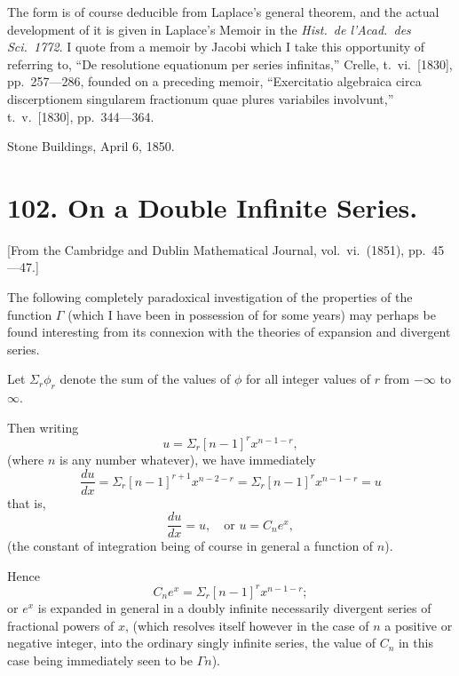 \documentclass[11pt,a4paper]{book}
\begin{document}
The form is of course deducible from Laplace's general theorem, and the actual development of it is given in Laplace's Memoir in the \textit{Hist.\ de l'Acad.\ des Sci.\ 1772}. I quote from a memoir by Jacobi which I take this opportunity of referring to, ``De resolutione equationum per series infinitas,'' Crelle, t.\ vi.\ [1830], pp.\ 257---286, founded on a preceding memoir, ``Exercitatio algebraica circa discerptionem singularem fractionum quae plures variabiles involvunt,'' t.\ v.\ [1830], pp.\ 344---364.

\begin{flushright}
Stone Buildings, April 6, 1850.
\end{flushright}
\clearpage


\section*{102. On a Double Infinite Series.}

[From the Cambridge and Dublin Mathematical Journal, vol.\ vi.\ (1851), pp.\ 45---47.]

The following completely paradoxical investigation of the properties of the function $\Gamma$ (which I have been in possession of for some years) may perhaps be found interesting from its connexion with the theories of expansion and divergent series.

Let $\Sigma_r \phi_r$ denote the sum of the values of $\phi$ for all integer values of $r$ from $-\infty$ to $\infty$.

Then writing
\begin{equation}
u = \Sigma_r [n-1]^r x^{n-1-r},\tag{1}\end{equation}
(where $n$ is any number whatever), we have immediately
\[\frac{du}{dx} = \Sigma_r [n-1]^{r+1} x^{n-2-r} = \Sigma_r [n-1]^r x^{n-1-r} = u\]
that is,
\[\frac{du}{dx} = u, \quad \text{or } u = C_n e^x,\]
(the constant of integration being of course in general a function of $n$).

Hence
\begin{equation}C_n e^x = \Sigma_r [n-1]^r x^{n-1-r};\tag{2}\end{equation}
or $e^x$ is expanded in general in a doubly infinite necessarily divergent series of fractional powers of $x$, (which resolves itself however in the case of $n$ a positive or negative integer, into the ordinary singly infinite series, the value of $C_n$ in this case being immediately seen to be $\Gamma n$).
\end{document}

